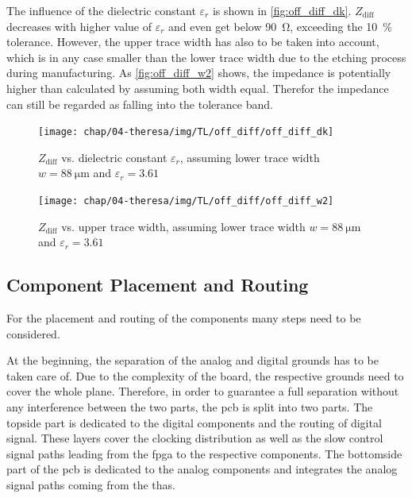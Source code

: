 The influence of the dielectric constant $\varepsilon_r$ is shown in \autoref{fig:off_diff_dk}. 
$Z_\text{diff}$ decreases with higher value of $\varepsilon_r$ and even get below \SI{90}{\ohm}, exceeding the \SI{10}{\percent} tolerance.
However, the upper trace width has also to be taken into account, which is in any case smaller than the lower trace width due to the etching process during manufacturing.
As \autoref{fig:off_diff_w2} shows, the impedance is potentially higher than calculated by assuming both width equal. Therefor the impedance can still be regarded as falling into the tolerance band.
\begin{figure}[tbh]
	\centering
	\texttt{[image: chap/04-theresa/img/TL/off\_diff/off\_diff\_dk]}
	\caption[DOWG, $Z_\text{diff}$ vs. $\varepsilon_r$]{$Z_\text{diff}$ vs. dielectric constant $\varepsilon_r$, assuming lower trace width $w = \SI{88}{\micro \meter}$ and $\varepsilon_r = 3.61$}
	\label{fig:off_diff_dk}
\end{figure}


\begin{figure}[tbh]
	\centering
	\texttt{[image: chap/04-theresa/img/TL/off\_diff/off\_diff\_w2]}
	\caption[DOWG, $Z_\text{diff}$ vs. upper trace width]{$Z_\text{diff}$ vs. upper trace width, assuming lower trace width $w = \SI{88}{\micro \meter}$ and $\varepsilon_r = 3.61$}
	\label{fig:off_diff_w2}
\end{figure}



\subsection{Component Placement and Routing}
For the placement and routing of the components many steps need to be considered.

At the beginning, the separation of the analog and digital grounds has to be taken care of. 
Due to the complexity of the board, the respective grounds need to cover the whole plane. 
Therefore, in order to guarantee a full separation without any interference between the two parts, the \gls{pcb} is split into two parts.
The topside part is dedicated to the digital components and the routing of digital signal. 
These layers cover the clocking distribution as well as the slow control signal paths leading from the \gls{fpga} to the respective components.
The bottomside part of the \gls{pcb} is dedicated to the analog components and integrates the analog signal paths coming from the \glspl{tha}.

